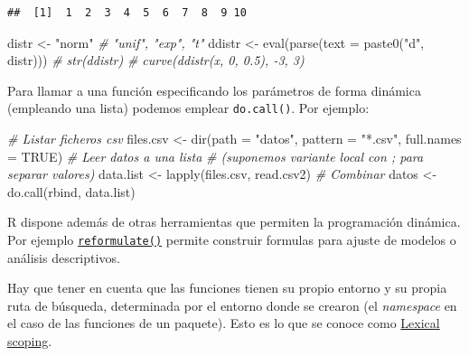 \documentclass[
]{book}
\newenvironment{Shaded}{\begin{snugshade}}{\end{snugshade}}
\newcommand{\AttributeTok}[1]{\textcolor[rgb]{0.77,0.63,0.00}{#1}}
\newcommand{\CommentTok}[1]{\textcolor[rgb]{0.56,0.35,0.01}{\textit{#1}}}
\newcommand{\ConstantTok}[1]{\textcolor[rgb]{0.00,0.00,0.00}{#1}}
\newcommand{\FunctionTok}[1]{\textcolor[rgb]{0.00,0.00,0.00}{#1}}
\newcommand{\NormalTok}[1]{#1}
\newcommand{\OtherTok}[1]{\textcolor[rgb]{0.56,0.35,0.01}{#1}}
\newcommand{\StringTok}[1]{\textcolor[rgb]{0.31,0.60,0.02}{#1}}
\theoremstyle{break}
\theoremstyle{nonumberplain}
\begin{document}
\begin{verbatim}
##  [1]  1  2  3  4  5  6  7  8  9 10
\end{verbatim}

\begin{Shaded}
\begin{Highlighting}[]
\NormalTok{distr }\OtherTok{\textless{}{-}} \StringTok{"norm"}  \CommentTok{\# "unif", "exp", "t"}
\NormalTok{ddistr }\OtherTok{\textless{}{-}} \FunctionTok{eval}\NormalTok{(}\FunctionTok{parse}\NormalTok{(}\AttributeTok{text =} \FunctionTok{paste0}\NormalTok{(}\StringTok{"d"}\NormalTok{, distr)))}
\CommentTok{\# str(ddistr)}
\CommentTok{\# curve(ddistr(x, 0, 0.5), {-}3, 3)}
\end{Highlighting}
\end{Shaded}

Para llamar a una función especificando los parámetros de forma dinámica (empleando una lista) podemos emplear \texttt{do.call()}.
Por ejemplo:

\begin{Shaded}
\begin{Highlighting}[]
\CommentTok{\# Listar ficheros csv }
\NormalTok{files.csv }\OtherTok{\textless{}{-}} \FunctionTok{dir}\NormalTok{(}\AttributeTok{path =} \StringTok{"datos"}\NormalTok{, }\AttributeTok{pattern =} \StringTok{"*.csv"}\NormalTok{, }\AttributeTok{full.names =} \ConstantTok{TRUE}\NormalTok{)}
\CommentTok{\# Leer datos a una lista}
\CommentTok{\# (suponemos variante local con ; para separar valores)}
\NormalTok{data.list }\OtherTok{\textless{}{-}} \FunctionTok{lapply}\NormalTok{(files.csv, read.csv2)}
\CommentTok{\# Combinar }
\NormalTok{datos }\OtherTok{\textless{}{-}} \FunctionTok{do.call}\NormalTok{(}\StringTok{\textquotesingle{}rbind\textquotesingle{}}\NormalTok{, data.list)}
\end{Highlighting}
\end{Shaded}

R dispone además de otras herramientas que permiten la programación dinámica.
Por ejemplo \href{https://rdrr.io/r/stats/delete.response.html}{\texttt{reformulate()}} permite construir formulas para ajuste de modelos o análisis descriptivos.

Hay que tener en cuenta que las funciones tienen su propio entorno y su propia ruta de búsqueda, determinada por el entorno donde se crearon (el \emph{namespace} en el caso de las funciones de un paquete).
Esto es lo que se conoce como \href{https://adv-r.hadley.nz/functions.html\#lexical-scoping}{Lexical scoping}.
\end{document}
